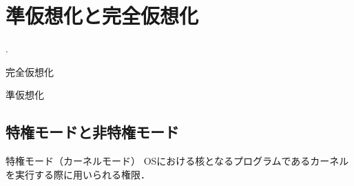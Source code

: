 \section{準仮想化と完全仮想化}
\tocc
\begin{frame}[t]{\thesection.\ \secname}
    \begin{block}{完全仮想化}

    \end{block}
    \begin{block}{準仮想化}

    \end{block}
\end{frame}
\subsection{特権モードと非特権モード}
\begin{frame}[t]{\ftitle}
    \begin{block}{特権モード（カーネルモード）}
        OSにおける核となるプログラムであるカーネルを実行する際に用いられる権限．
    \end{block}
\end{frame}
